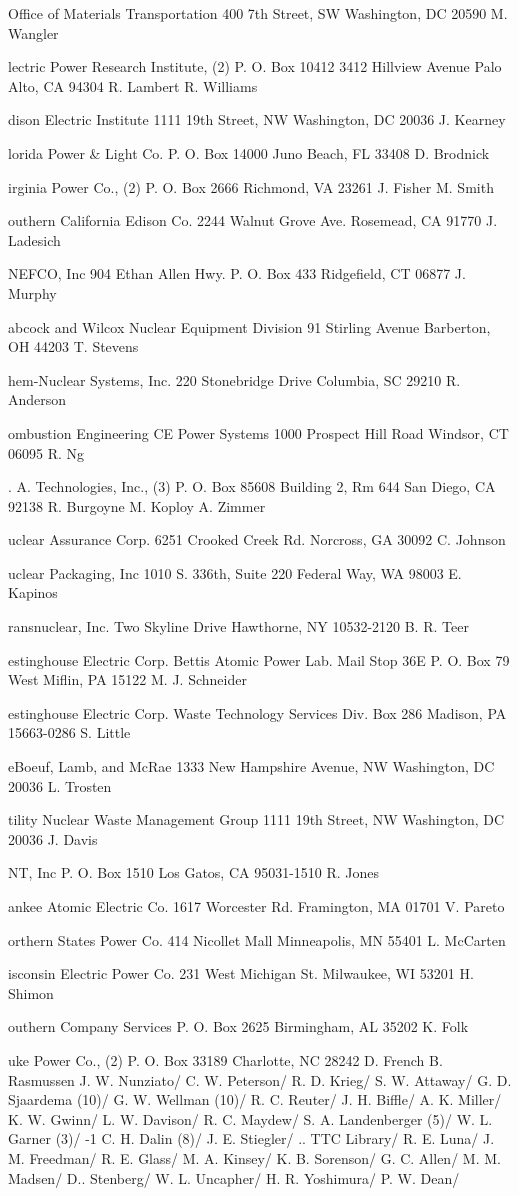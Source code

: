 \begin{flushleft}
Office of Materials Transportation
400 7th Street, SW
Washington, DC 20590
\name
M. Wangler
\address
Electric Power Research Institute, (2)
P. O. Box 10412
3412 Hillview Avenue
Palo Alto, CA 94304
\name
R. Lambert
R. Williams
\address
Edison Electric Institute
1111 19th Street, NW
Washington, DC 20036
\name
J. Kearney
\address
Florida Power \& Light Co.
P. O. Box 14000
Juno Beach, FL 33408
\name
D. Brodnick
\address
Virginia Power Co., (2)
P. O. Box 2666
Richmond, VA 23261
\name
J. Fisher
M. Smith
\address
Southern California Edison Co.
2244 Walnut Grove Ave.
Rosemead, CA 91770
\name
J. Ladesich
\address
ANEFCO, Inc
904 Ethan Allen Hwy.
P. O. Box 433
Ridgefield, CT 06877
\name
J. Murphy
\address
Babcock and Wilcox
Nuclear Equipment Division
91 Stirling Avenue
Barberton, OH 44203
\name
T. Stevens
\address
Chem-Nuclear Systems, Inc.
220 Stonebridge Drive
Columbia, SC 29210
\name
R. Anderson
\address
Combustion Engineering
CE Power Systems
1000 Prospect Hill Road
Windsor, CT 06095
\name
R. Ng
\address
G. A. Technologies, Inc., (3)
P. O. Box 85608
Building 2, Rm 644
San Diego, CA 92138
\name
R. Burgoyne
M. Koploy
A. Zimmer
\address
Nuclear Assurance Corp.
6251 Crooked Creek Rd.
Norcross, GA 30092
\name
C. Johnson
\address
Nuclear Packaging, Inc
1010 S. 336th, Suite 220
Federal Way, WA 98003
\name
E. Kapinos
\address
Transnuclear, Inc.
Two Skyline Drive
Hawthorne, NY 10532-2120
\name
B. R. Teer
\address
Westinghouse Electric Corp.
Bettis Atomic Power Lab.
Mail Stop 36E
P. O. Box 79
West Miflin, PA 15122
\name
M. J. Schneider
\address
Westinghouse Electric Corp.
Waste Technology Services Div.
Box 286
Madison, PA 15663-0286
\name
S. Little
\address
LeBoeuf, Lamb, and McRae
1333 New Hampshire Avenue, NW
Washington, DC 20036
\name
L. Trosten
\address
Utility Nuclear Waste Management Group
1111 19th Street, NW
Washington, DC 20036
\name
J. Davis
\address
JNT, Inc
P. O. Box 1510
Los Gatos, CA 95031-1510
\name
R. Jones
\address
Yankee Atomic Electric Co.
1617 Worcester Rd.
Framington, MA 01701
\name
V. Pareto
\address
Northern States Power Co.
414 Nicollet Mall
Minneapolis, MN 55401
\name
L. McCarten
\address
Wisconsin Electric Power Co.
231 West Michigan St.
Milwaukee, WI 53201
\name
H. Shimon
\address
Southern Company Services
P. O. Box 2625
Birmingham, AL 35202
\name
K. Folk
\address
Duke Power Co., (2)
P. O. Box 33189
Charlotte, NC 28242
\name
D. French
B. Rasmussen
\SanInt
{}  J. W. Nunziato/
  C. W. Peterson/
 R. D. Krieg/
 S. W. Attaway/
 G. D. Sjaardema (10)/
 G. W. Wellman (10)/
 R. C. Reuter/
 J. H. Biffle/
 A. K. Miller/
 K. W. Gwinn/
  L. W. Davison/
  R. C. Maydew/
 S. A. Landenberger (5)/
 W. L. Garner (3)/
-1 C. H. Dalin (8)/
 J. E. Stiegler/
 .. TTC Library/
 R. E. Luna/
 J. M. Freedman/
 R. E. Glass/
 M. A. Kinsey/
 K. B. Sorenson/
 G. C. Allen/
 M. M. Madsen/
 D.. Stenberg/
 W. L. Uncapher/
 H. R. Yoshimura/
 P. W. Dean/
\end{flushleft}



